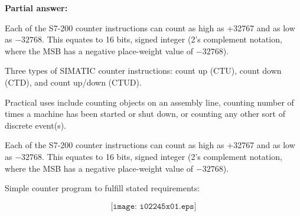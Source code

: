 





\noindent
{\bf Partial answer:}

\vskip 10pt

Each of the S7-200 counter instructions can count as high as +32767 and as low as $-32768$.  This equates to 16 bits, signed integer (2's complement notation, where the MSB has a negative place-weight value of $-32768$).







Three types of SIMATIC counter instructions: count up (CTU), count down (CTD), and count up/down (CTUD).

\vskip 10pt

Practical uses include counting objects on an assembly line, counting number of times a machine has been started or shut down, or counting any other sort of discrete event(s).

\vskip 10pt

Each of the S7-200 counter instructions can count as high as +32767 and as low as $-32768$.  This equates to 16 bits, signed integer (2's complement notation, where the MSB has a negative place-weight value of $-32768$).

\vskip 10pt

Simple counter program to fulfill stated requirements:

$$\texttt{[image: i02245x01.eps]}$$




